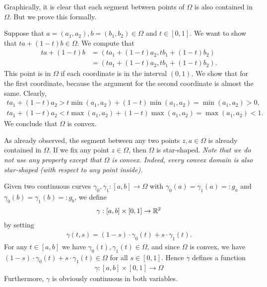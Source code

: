 \documentclass[11pt]{article}
\begin{document}
\begin{solution}
    \item
	Graphically, it is clear that each segment between points of $\Omega$ is also contained in $\Omega$. 
	But we prove this formally. 
	
	Suppose that $a = (a_1,a_2), b = (b_1,b_2) \in \Omega$ and $t \in [0,1]$. We want to show that $ta + (1-t)b \in \Omega$.
	We compute that 
	\begin{align*}
		ta + (1-t)b
		&=
		\left( t a_1 + (1-t) a_2, t b_1 + (1-t) b_2 \right)
		\\&=
		\left( t a_1 + (1-t) a_2, t b_1 + (1-t) b_2 \right)
		.
	\end{align*}
	This point is in $\Omega$ if each coordinate is in the interval $(0,1)$. We show that for the first coordinate,
	because the argument for the second coordinate is almost the same. 
	Clearly,
	\begin{align*}
		t a_1 + (1-t) a_2 > t \min(a_1,a_2) + (1-t) \min(a_1,a_2) = \min(a_1,a_2) > 0,
	\end{align*}
	\begin{align*}
		t a_1 + (1-t) a_2 < t \max(a_1,a_2) + (1-t) \max(a_1,a_2) = \max(a_1,a_2) < 1.
	\end{align*}
	We conclude that $\Omega$ is convex.
	\item 
	As already observed, the segment between any two points $z,a \in \Omega$ is already contained in $\Omega$. 
	If we fix any point $z \in \Omega$, then $\Omega$ is star-shaped. \textit{Note that we do not use any property except that $\Omega$ is convex. Indeed, every convex domain is also star-shaped (with respect to any point inside).}
    \item 
    Given two continuous curves $\gamma_0, \gamma_1 : [a,b] \rightarrow \Omega$ with $\gamma_0(a) = \gamma_1(a) =: g_a$ and $\gamma_0(b) = \gamma_1(b) =: g_b$, we define 
    \begin{align*}
        \gamma : [a,b] \times [0,1] \rightarrow \mathbb{R}^2
    \end{align*}
    by setting 
    \begin{align*}
        \gamma(t,s) = (1-s) \cdot \gamma_0(t) + s \cdot \gamma_1(t).
    \end{align*}
    For any $t \in [a,b]$ we have $\gamma_0(t), \gamma_1(t) \in \Omega$,
    and since $\Omega$ is convex, we have $(1-s) \cdot \gamma_0(t) + s \cdot \gamma_1(t) \in \Omega$ for all $s \in [0,1]$.
    Hence $\gamma$ defines a function 
    \begin{align*}
        \gamma : [a,b] \times [0,1] \rightarrow \Omega
    \end{align*}
    Furthermore, $\gamma$ is obviously continuous in both variables. 
    

\end{solution}
\end{document}
